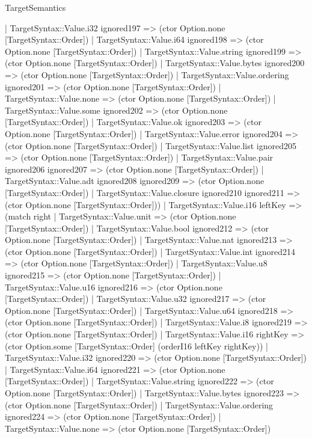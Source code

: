 \begin{lexlean}{TargetSemantics}
\begin{semanticmodule}
{      | TargetSyntax::Value.i32 ignored197 => (ctor Option.none [TargetSyntax::Order])
      | TargetSyntax::Value.i64 ignored198 => (ctor Option.none [TargetSyntax::Order])
      | TargetSyntax::Value.string ignored199 => (ctor Option.none [TargetSyntax::Order])
      | TargetSyntax::Value.bytes ignored200 => (ctor Option.none [TargetSyntax::Order])
      | TargetSyntax::Value.ordering ignored201 => (ctor Option.none [TargetSyntax::Order])
      | TargetSyntax::Value.none => (ctor Option.none [TargetSyntax::Order])
      | TargetSyntax::Value.some ignored202 => (ctor Option.none [TargetSyntax::Order])
      | TargetSyntax::Value.ok ignored203 => (ctor Option.none [TargetSyntax::Order])
      | TargetSyntax::Value.error ignored204 => (ctor Option.none [TargetSyntax::Order])
      | TargetSyntax::Value.list ignored205 => (ctor Option.none [TargetSyntax::Order])
      | TargetSyntax::Value.pair ignored206 ignored207 => (ctor Option.none [TargetSyntax::Order])
      | TargetSyntax::Value.adt ignored208 ignored209 => (ctor Option.none [TargetSyntax::Order])
      | TargetSyntax::Value.closure ignored210 ignored211 => (ctor Option.none [TargetSyntax::Order]))
    | TargetSyntax::Value.i16 leftKey => (match right
      | TargetSyntax::Value.unit => (ctor Option.none [TargetSyntax::Order])
      | TargetSyntax::Value.bool ignored212 => (ctor Option.none [TargetSyntax::Order])
      | TargetSyntax::Value.nat ignored213 => (ctor Option.none [TargetSyntax::Order])
      | TargetSyntax::Value.int ignored214 => (ctor Option.none [TargetSyntax::Order])
      | TargetSyntax::Value.u8 ignored215 => (ctor Option.none [TargetSyntax::Order])
      | TargetSyntax::Value.u16 ignored216 => (ctor Option.none [TargetSyntax::Order])
      | TargetSyntax::Value.u32 ignored217 => (ctor Option.none [TargetSyntax::Order])
      | TargetSyntax::Value.u64 ignored218 => (ctor Option.none [TargetSyntax::Order])
      | TargetSyntax::Value.i8 ignored219 => (ctor Option.none [TargetSyntax::Order])
      | TargetSyntax::Value.i16 rightKey => (ctor Option.some [TargetSyntax::Order] (orderI16 leftKey rightKey))
      | TargetSyntax::Value.i32 ignored220 => (ctor Option.none [TargetSyntax::Order])
      | TargetSyntax::Value.i64 ignored221 => (ctor Option.none [TargetSyntax::Order])
      | TargetSyntax::Value.string ignored222 => (ctor Option.none [TargetSyntax::Order])
      | TargetSyntax::Value.bytes ignored223 => (ctor Option.none [TargetSyntax::Order])
      | TargetSyntax::Value.ordering ignored224 => (ctor Option.none [TargetSyntax::Order])
      | TargetSyntax::Value.none => (ctor Option.none [TargetSyntax::Order])
}
\end{semanticmodule}
\end{lexlean}
